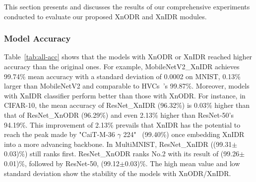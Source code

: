 \documentclass[sn-mathphys,iicol,Numbered]{sn-jnl}
\begin{document}
This section presents and discusses the results of our comprehensive experiments conducted to evaluate our proposed XnODR and XnIDR modules.

\subsubsection{Model Accuracy} \label{sec:4.4.1}

Table~\ref{tab:all-acc} shows that the models with XnODR or XnIDR reached higher accuracy than the original ones. For example, MobileNetV2\_XnIDR achieves 99.74\% mean accuracy with a standard deviation of 0.0002 on MNIST, 0.13\% larger than MobileNetV2 and comparable to HVCs~\citep{A8_hvcs}'s 99.87\%. Moreover, models with XnIDR classifier perform better than those with XnODR. For instance, in CIFAR-10, the mean accuracy of ResNet\_XnIDR (96.32\%) is 0.03\% higher than that of ResNet\_XnODR (96.29\%) and even 2.13\% higher than ResNet-50's 94.19\%. This improvement of 2.13\% prevails that XnIDR has the potential to reach the peak made by "CaiT-M-36 $\gamma$ 224"~\citep{A6_cifar10sota_extra} (99.40\%) once embedding XnIDR into a more advancing backbone. In MultiMNIST, ResNet\_XnIDR ((99.31$\pm$0.03)\%) still ranks first. ResNet\_XnODR ranks No.2 with its result of (99.26$\pm$0.01)\%, followed by ResNet-50, (99.12$\pm$0.03)\%. The high mean value and low standard deviation show the stability of the models with XnODR/XnIDR.
\end{document}
